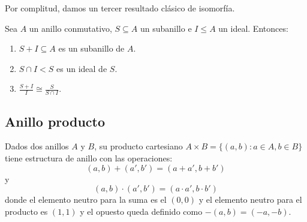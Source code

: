 Por complitud, damos un tercer resultado clásico de isomorfía. 

\begin{theorem}
Sea $A$ un anillo conmutativo, $S \subseteq A$ un subanillo e $I \le A$ un ideal. Entonces:

\begin{enumerate}
\item $S+I \subseteq A$ es un subanillo de $A$. 
\item $S \cap I < S$ es un ideal de $S$. 
\item $\frac{S+I}{I} \cong \frac{S}{S \cap I}$. 
\end{enumerate}

\end{theorem}

\subsection{Anillo producto}

\begin{definition}
	Dados dos anillos $A$ y $B$, su producto cartesiano $A \times B = \{(a,b):a \in A,b \in B\}$ tiene estructura de anillo con las operaciones: $$(a,b)+(a',b') = (a+a',b+b')$$ y $$(a,b) \cdot (a',b') = (a \cdot a',b \cdot b')$$ donde el elemento neutro para la suma es el $(0,0)$ y el elemento neutro para el producto es $(1,1)$ y el opuesto queda definido como $-(a,b) = (-a,-b)$. 
\end{definition}

